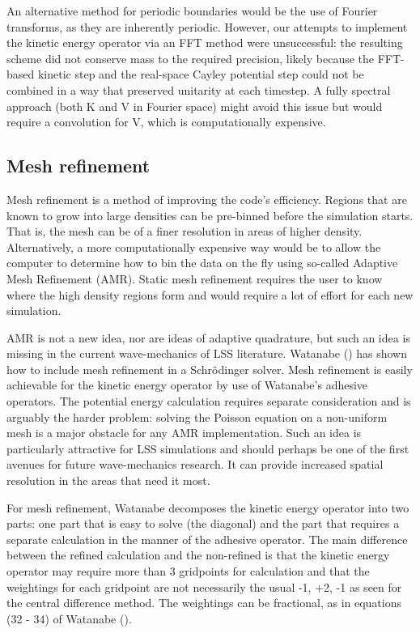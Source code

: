 An alternative method for periodic boundaries would be the use of Fourier transforms, as they are inherently periodic. However, our attempts to implement the kinetic energy operator via an FFT method were unsuccessful: the resulting scheme did not conserve mass to the required precision, likely because the FFT-based kinetic step and the real-space Cayley potential step could not be combined in a way that preserved unitarity at each timestep. A fully spectral approach (both K and V in Fourier space) might avoid this issue but would require a convolution for V, which is computationally expensive.

\subsection{Mesh refinement}
Mesh refinement is a method of improving the code's efficiency. Regions that are known to grow into large densities can be pre-binned before the simulation starts. That is, the mesh can be of a finer resolution in areas of higher density. Alternatively, a more computationally expensive way would be to allow the computer to determine how to bin the data on the fly using so-called Adaptive Mesh Refinement (AMR). Static mesh refinement requires the user to know where the high density regions form and would require a lot of effort for each new simulation.

AMR is not a new idea, nor are ideas of adaptive quadrature, but such an idea is missing in the current wave-mechanics of LSS literature.
Watanabe (\citeyear{bib_wat}) has shown how to include mesh refinement in a Schr\"odinger solver. Mesh refinement is easily achievable for the kinetic energy operator by use of Watanabe's adhesive operators. The potential energy calculation requires separate consideration and is arguably the harder problem: solving the Poisson equation on a non-uniform mesh is a major obstacle for any AMR implementation. Such an idea is particularly attractive for LSS simulations and should perhaps be one of the first avenues for future wave-mechanics research. It can provide increased spatial resolution in the areas that need it most.

For mesh refinement, Watanabe decomposes the kinetic energy operator into two parts: one part that is easy to solve (the diagonal) and the part that requires a separate calculation in the manner of the adhesive operator. The main difference between the refined calculation and the non-refined is that the kinetic energy operator may require more than 3 gridpoints for calculation and that the weightings for each gridpoint are not necessarily the usual -1, +2, -1 as seen for the central difference method. The weightings can be fractional, as in equations (32 - 34) of Watanabe (\citeyear{bib_wat}).

